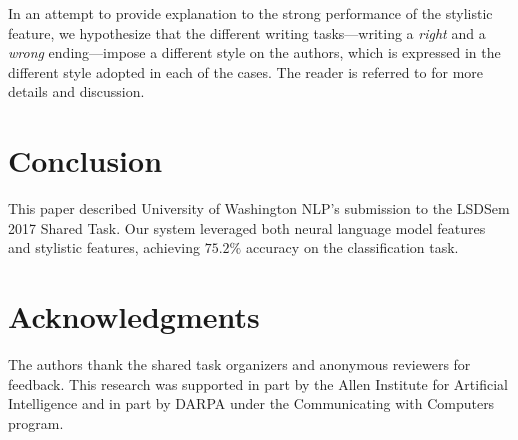 \documentclass[11pt]{article}
\newcommand{\nascomment}[1]{\textcolor{blue}{[\textsc{#1 --nas}]}}
\newcommand{\resolved}[1]{}
\begin{document}
In an attempt to provide explanation to the strong performance of the stylistic feature, 
we hypothesize that the different writing tasks---writing a {\it right} and a {\it wrong} ending---impose a different style on the authors, which is expressed in the different style adopted in each of the cases. 
The reader is referred to  for more details and discussion.


\section{Conclusion}
This paper described University of Washington NLP's submission to the LSDSem 2017 Shared Task. 
Our system leveraged both neural language model features and  stylistic features, achieving $75.2\%$ accuracy on the classification task. 

\section*{Acknowledgments}
The authors thank the shared task organizers and anonymous reviewers
for feedback.\resolved{\nascomment{ anyone else}} This research was supported in
part by the Allen Institute for Artificial Intelligence and in part by
DARPA under the Communicating with Computers program.



\end{document}
